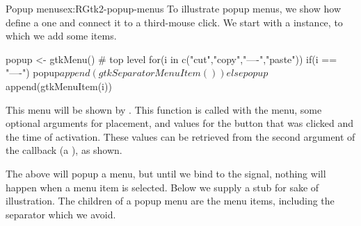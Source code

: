 \begin{example}{Popup menus}{ex:RGtk2-popup-menus}
To illustrate popup menus, we show how define a one and connect it to
a third-mouse click. We start with a  instance, to which we add some items.
\begin{Schunk}
\begin{Sinput}
 popup <- gtkMenu()                       # top level
 for(i in c("cut","copy","----","paste")) {
   if(i == "----")
     popup$append(gtkSeparatorMenuItem())
   else
     popup$append(gtkMenuItem(i))
 }
\end{Sinput}
\end{Schunk}

This menu will be shown by . This function is
called with the menu, some optional arguments for placement, and
values for the button that was clicked and the time of
activation. These values can be retrieved from the second argument of
the callback (a ), as shown.
\begin{Schunk}
\end{Schunk}

The above will popup a menu, but until we bind to the 
signal, nothing will happen when a menu item is selected. Below we
supply a stub for sake of illustration. The children of a popup menu
are the menu items, including the separator which we avoid.
\begin{Schunk}
\end{Schunk}
\end{example}


